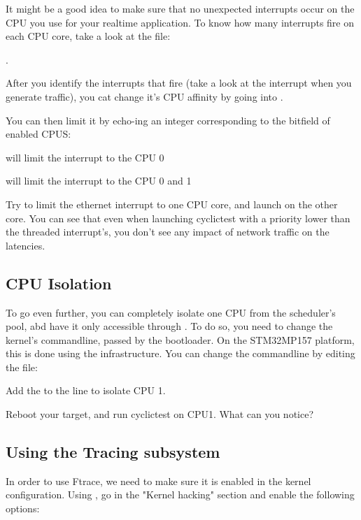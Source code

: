 It might be a good idea to make sure that no unexpected interrupts occur on the CPU
you use for your realtime application. To know how many interrupts fire on each CPU
core, take a look at the  file:

.

After you identify the interrupts that fire (take a look at the  interrupt
when you generate traffic), you cat change it's CPU affinity by going into .

You can then limit it by echo-ing an integer corresponding to the bitfield of enabled CPUS:

 will limit the interrupt to the CPU 0

 will limit the interrupt to the CPU 0 and 1

Try to limit the ethernet interrupt to one CPU core, and launch  on the
other core. You can see that even when launching cyclictest with a priority lower than
the threaded interrupt's, you don't see any impact of network traffic on the latencies.

\subsection{CPU Isolation}

To go even further, you can completely isolate one CPU from the scheduler's pool,
abd have it only accessible through . To do so, you need to change
the kernel's commandline, passed by the bootloader. On the STM32MP157 platform,
this is done using the  infrastructure. You can change the
commandline by editing the  file:


Add the  to the  line to isolate CPU 1.

Reboot your target, and run cyclictest on CPU1. What can you notice?

\subsection{Using the Tracing subsystem}

In order to use Ftrace, we need to make sure it is enabled in the kernel
configuration. Using , go in the "Kernel hacking" section
and enable the following options:


